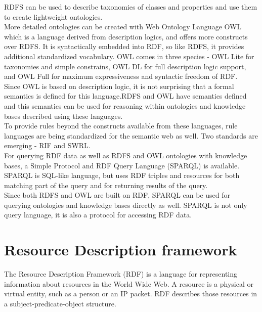 \documentclass[a4paper,12pt,oneside]{report}
\begin{document}
{{ RDFS can be used to describe taxonomies of classes and properties and use them to create lightweight ontologies.\\
More detailed ontologies can be created with Web Ontology Language OWL which  is a language derived from description logics, and offers more constructs over RDFS. It is syntactically embedded into RDF, so like RDFS, it provides additional standardized vocabulary. OWL comes in three species - OWL Lite for taxonomies and simple constrains, OWL DL for full description logic support, and OWL Full for maximum expressiveness and syntactic freedom of RDF. \\
Since OWL is based on description logic, it is not surprising that a formal semantics is defined for this language.RDFS and OWL have semantics defined and this semantics can be used for reasoning within ontologies and knowledge bases described using these languages. \\
To provide rules beyond the constructs available from these languages, rule languages are being standardized for the semantic web as well. Two standards are emerging - RIF and SWRL.\\
For querying RDF data as well as RDFS and OWL ontologies with knowledge bases, a Simple Protocol and RDF Query Language (SPARQL) is available.\\
 SPARQL is SQL-like language, but uses RDF triples and resources for both matching part of the query and for returning results of the query. \\
Since both RDFS and OWL are built on RDF, SPARQL can be used for querying ontologies and knowledge bases directly as well. SPARQL is not only query language, it is also a protocol for accessing RDF data.}
\section{Resource Description framework}
{The Resource Description Framework (RDF) is a language for representing information about resources in the World Wide Web. A resource is a physical or virtual entity, such as a person or an IP packet. RDF describes those resources in a subject-predicate-object structure.}
}
\end{document}

